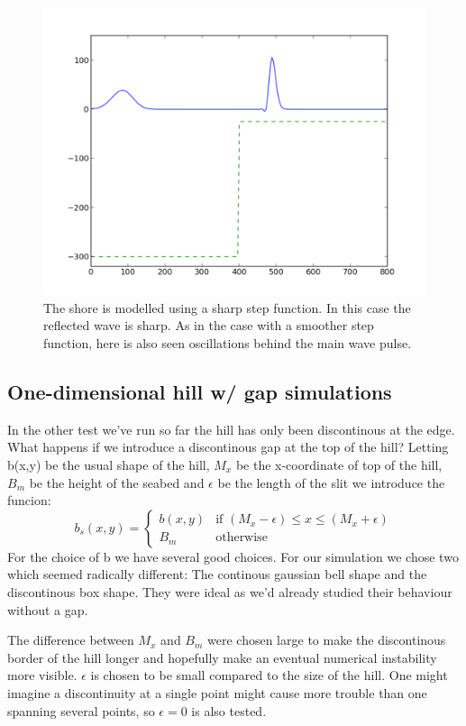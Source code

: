 \documentclass[twoside]{article}
\begin{document}
\begin{figure} 
  \centering
  \includegraphics[scale=0.4]{gustavs_codes/movie_1dwave_box_shore/figure.pdf}
  \caption{The shore is modelled using a sharp step function. In this case the reflected wave is sharp. As in the case with a smoother step function, here is also seen oscillations behind the main wave pulse.}
\end{figure}
 
\subsection{One-dimensional hill w/ gap simulations}
In the other test we've run so far the hill has only been discontinous at the edge. What happens if we introduce a discontinous gap at the top of the hill? Letting b(x,y) be the usual shape of the hill, $M_x$ be the x-coordinate of top of the hill, $B_m$ be the height of the seabed and $\epsilon$ be the length of the slit we introduce the funcion:
$$ b_s(x,y) = 
\left\{
	\begin{array}{ll}
		b(x,y)  & \mbox{if } (M_x - \epsilon) \le x \le (M_x + \epsilon) \\
		B_m & \mbox{otherwise}
	\end{array}
\right.
$$
For the choice of b we have several good choices. For our simulation we chose two which seemed radically different: The continous gaussian bell shape and the discontinous box shape. They were ideal as we'd already studied their behaviour without a gap. 

The difference between $M_x$ and $B_m$ were chosen large to make the discontinous border of the hill longer and hopefully make an eventual numerical instability more visible. $\epsilon$ is chosen to be small compared to the size of the hill. One might imagine a discontinuity at a single point might cause more trouble than one spanning several points, so $\epsilon = 0$ is also tested.
\end{document}
